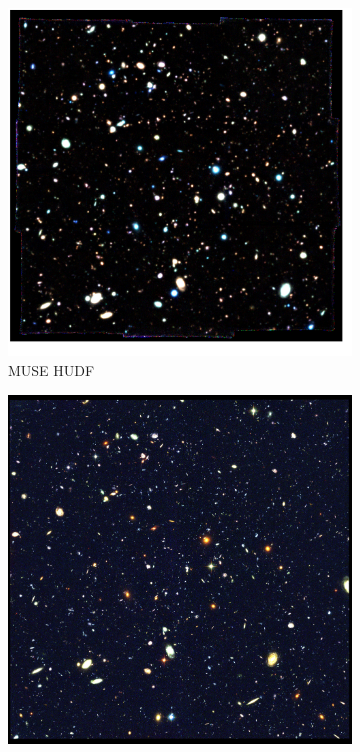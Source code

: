 \documentclass[12pt, twocolumn]{revtex4}    %
\begin{document}
\begin{figure}
  \begin{subfigure}[b]{0.4\textwidth}
    \includegraphics[width=\textwidth]{introduction/muse_colour_image}
    \captionsetup{justification=justified}    
    \caption{MUSE HUDF}               
    \label{fig:muse_colour_image}
  \end{subfigure}
  \begin{subfigure}[b]{0.4\textwidth}
    \includegraphics[width=\textwidth]{introduction/hubble_ultra_deep_field_rotated-squashed.jpg}

\end{subfigure}
\end{figure}
\end{document}
